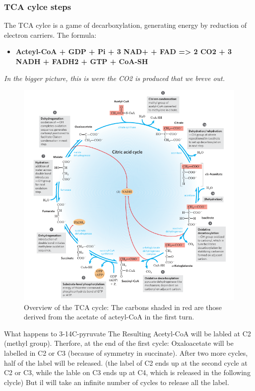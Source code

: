 \documentclass[../main.tex]{subfiles}
\begin{document}
\subsubsection{TCA cylce steps}
The TCA cylce is a game of decarboxylation, generating energy by reduction of electron carriers. The formula: 
\begin{itemize}
	\item \textbf{Acteyl-CoA + GDP + Pi + 3 NAD+ + FAD => 2 CO2 + 3 NADH + FADH2 + GTP + CoA-SH}
\end{itemize}
\noindent \textit{In the bigger picture, this is were the CO2 is produced that we breve out.}
\begin{figure}[H]
	\centering
	\includegraphics[width = \textwidth]{TCA1}
	\caption{Overview of the TCA cycle: The carbons shaded in red are those derived from the acetate of acteyl-CoA in the first turn.}
\end{figure}

\begin{RemarkWithTitel}{What happens to 3-14C-pyruvate}
	 The Resulting Acetyl-CoA will be labled at C2 (methyl group). Therfore, at the end of the first cycle: Oxaloacetate will be labelled in C2 or C3 (because of symmetry in succinate). After two more cycles, half of the label will be released. (the label of C2 ends up at the second cycle at C2 or C3, while the lable on C3 ends up at C4, which is released in the following clycle) But il will take an infinite number of cycles to release all the label. 
\end{RemarkWithTitel}
\end{document}
